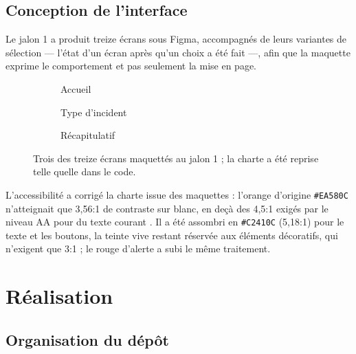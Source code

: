 \documentclass[11pt,a4paper,oneside,openany]{report}
\begin{document}
\section{Conception de l'interface}

Le jalon 1 a produit treize écrans sous Figma, accompagnés de leurs variantes de
sélection — l'état d'un écran après qu'un choix a été fait —, afin que la
maquette exprime le comportement et pas seulement la mise en page.

\begin{figure}[htbp]
\centering
\begin{subfigure}[b]{0.268\textwidth}\centering
  \caption{Accueil}
\end{subfigure}\hfill
\begin{subfigure}[b]{0.268\textwidth}\centering
  \caption{Type d'incident}
\end{subfigure}\hfill
\begin{subfigure}[b]{0.268\textwidth}\centering
  \caption{Récapitulatif}
\end{subfigure}
\caption[Maquettes Figma du parcours]{Trois des treize écrans maquettés au jalon 1 ;
la charte a été reprise telle quelle dans le code.}
\label{fig:figma}
\end{figure}

L'accessibilité a corrigé la charte issue des maquettes : l'orange d'origine
\texttt{\#EA580C} n'atteignait que 3{,}56:1 de contraste sur blanc, en deçà des
4{,}5:1 exigés par le niveau AA pour du texte courant \cite{wcag}. Il a été
assombri en \texttt{\#C2410C} (5{,}18:1) pour le texte et les boutons, la teinte
vive restant réservée aux éléments décoratifs, qui n'exigent que 3:1 ; le rouge
d'alerte a subi le même traitement.

\chapter{Réalisation}
\label{chap:realisation}

\section{Organisation du dépôt}
\end{document}
